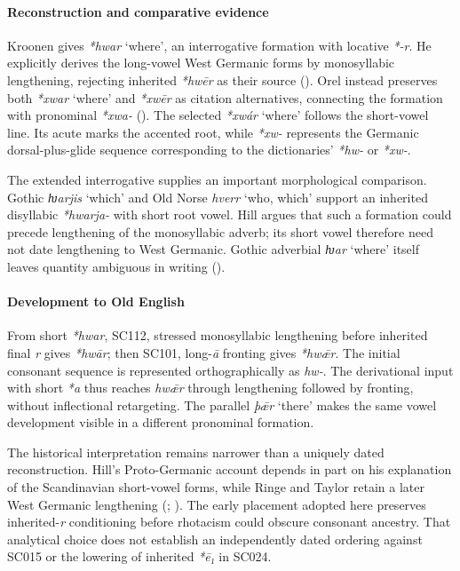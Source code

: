 \documentclass[
  british,
  a4paper,
]{article}
\providecommand{\Recon}[1]{\emph{*#1}}
\begin{document}
\paragraph{Reconstruction and comparative
evidence}\label{reconstruction-and-comparative-evidence-77}

Kroonen gives \Recon{hwar} `where', an interrogative formation with
locative \emph{*-r}. He explicitly derives the long-vowel West Germanic
forms by monosyllabic lengthening, rejecting inherited \emph{*hwēr} as
their source (). Orel
instead preserves both \Recon{xwar} `where' and \emph{*xwēr} as citation
alternatives, connecting the formation with pronominal \emph{*xwa-}
(). The selected \Recon{xwár}
`where' follows the short-vowel line. Its acute marks the accented root,
while \emph{*xw-} represents the Germanic dorsal-plus-glide sequence
corresponding to the dictionaries' \emph{*hw-} or \emph{*xw-}.

The extended interrogative supplies an important morphological
comparison. Gothic \emph{ƕarjis} `which' and Old Norse \emph{hverr}
`who, which' support an inherited disyllabic \emph{*hwarja-} with short
root vowel. Hill argues that such a formation could precede lengthening
of the monosyllabic adverb; its short vowel therefore need not date
lengthening to West Germanic. Gothic adverbial \emph{ƕar} `where' itself
leaves quantity ambiguous in writing ().

\paragraph{Development to Old
English}\label{development-to-old-english-78}

From short \emph{*hwar}, SC112, stressed monosyllabic lengthening before
inherited final \emph{r} gives \emph{*hwār}; then SC101, long-\emph{ā}
fronting gives \emph{*hwǣr}. The initial consonant sequence is
represented orthographically as \emph{hw-}. The derivational input with
short \emph{*a} thus reaches \emph{hwǣr} through lengthening followed by
fronting, without inflectional retargeting. The parallel \emph{þǣr}
`there' makes the same vowel development visible in a different
pronominal formation.

The historical interpretation remains narrower than a uniquely dated
reconstruction. Hill's Proto-Germanic account depends in part on his
explanation of the Scandinavian short-vowel forms, while Ringe and
Taylor retain a later West Germanic lengthening
(;
). The early
placement adopted here preserves inherited-\emph{r} conditioning before
rhotacism could obscure consonant ancestry. That analytical choice does
not establish an independently dated ordering against SC015 or the
lowering of inherited \emph{*ē₁} in SC024.
\end{document}
